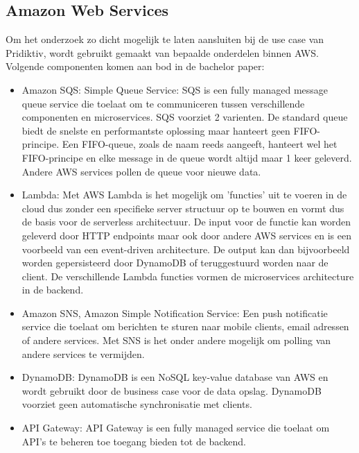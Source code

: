 \subsection{Amazon Web Services}
Om het onderzoek zo dicht mogelijk te laten aansluiten bij de use case van Pridiktiv, wordt gebruikt gemaakt van bepaalde onderdelen binnen AWS. Volgende componenten komen aan bod in de bachelor paper:
\begin{itemize}
\item Amazon SQS: Simple Queue Service: SQS is een fully managed message queue service die toelaat om te communiceren tussen verschillende componenten en microservices. SQS voorziet 2 varienten. De standard queue biedt de snelste en performantste oplossing maar hanteert geen FIFO-principe. Een FIFO-queue, zoals de naam reeds aangeeft, hanteert wel het FIFO-principe en elke message in de queue wordt altijd maar 1 keer geleverd. Andere AWS services pollen de queue voor nieuwe data.
\item Lambda: Met AWS Lambda is het mogelijk om 'functies' uit te voeren in de cloud dus zonder een specifieke server structuur op te bouwen en vormt dus de basis voor de serverless architectuur. De input voor de functie kan worden geleverd door HTTP endpoints maar ook door andere AWS services en is een voorbeeld van een event-driven architecture. De output kan dan bijvoorbeeld worden gepersisteerd door DynamoDB of teruggestuurd worden naar de client. De verschillende Lambda functies vormen de microservices architecture in de backend.
\item Amazon SNS, Amazon Simple Notification Service: Een push notificatie service die toelaat om berichten te sturen naar mobile clients, email adressen of andere services. Met SNS is het onder andere mogelijk om polling van andere services te vermijden.
\item DynamoDB: DynamoDB is een NoSQL key-value database van AWS en wordt gebruikt door de business case voor de data opslag. DynamoDB voorziet geen automatische synchronisatie met clients.
\item API Gateway: API Gateway is een fully managed service die toelaat om API's te beheren toe toegang bieden tot de backend.
\end{itemize}
